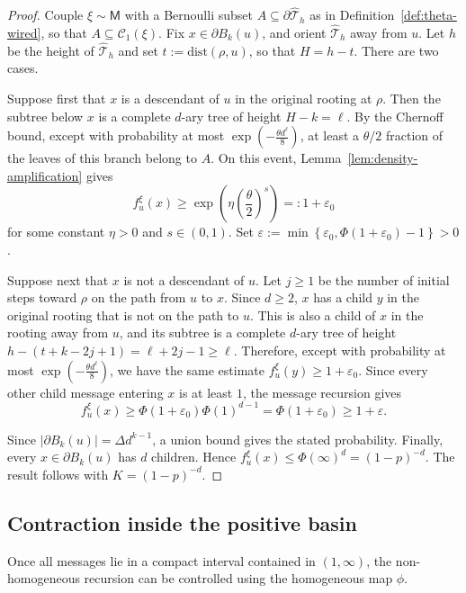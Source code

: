 \documentclass[11pt]{amsart}
\theoremstyle{plain}
\theoremstyle{definition}
\theoremstyle{remark}
\newcommand{\dreg}{\widehat {\mathcal T}_h}
\newcommand{\dist}{\mathrm{dist}}
\begin{document}
\begin{proof}
Couple $\xi\sim\mathsf M$ with a Bernoulli subset $A\subseteq\partial\dreg$ as in Definition~\ref{def:theta-wired}, so that $A\subseteq\mathcal C_1(\xi)$. Fix $x\in\partial B_k(u)$, and orient $\dreg$ away from $u$. Let $h$ be the height of $\dreg$ and set $t:=\dist(\rho,u)$, so that $H=h-t$. There are two cases.

Suppose first that $x$ is a descendant of $u$ in the original rooting at $\rho$. Then the subtree below $x$ is a complete $d$-ary tree of height $H-k=\ell$. By the Chernoff bound, except with probability at most $\exp\left(-\frac{\theta d^{\ell}}8\right)$, at least a $\theta/2$ fraction of the leaves of this branch belong to
$A$. On this event, Lemma~\ref{lem:density-amplification} gives
\[
    f_u^\xi(x)
    \ge
    \exp\left(
        \eta\left(\frac\theta2\right)^s
    \right)
    =:
    1+\varepsilon_0
\]
for some constant $\eta > 0$ and $s \in (0, 1)$. Set $\varepsilon:=\min\left\{\varepsilon_0,\Phi(1+\varepsilon_0)-1\right\}>0$.

Suppose next that $x$ is not a descendant of $u$. Let $j\ge1$ be the number of initial steps toward $\rho$ on the path from $u$ to $x$. Since $d\ge2$, $x$ has a child $y$ in the original rooting that is not on the path to $u$. This is also a child of $x$ in the rooting away from $u$, and its subtree is a complete $d$-ary tree of height $h-(t+k-2j+1)=\ell+2j-1\ge\ell$. Therefore, except with probability at most $\exp\left(-\frac{\theta d^\ell}{8}\right)$, we have the same estimate $f_u^\xi(y)\ge1+\varepsilon_0$. Since every other child message entering $x$ is at least $1$, the message recursion gives
\[
    f_u^\xi(x)
    \ge
    \Phi(1+\varepsilon_0)\Phi(1)^{d-1}
    =
    \Phi(1+\varepsilon_0)
    \ge
    1+\varepsilon.
\]

Since $|\partial B_k(u)|=\Delta d^{k-1}$, a union bound gives the stated probability. Finally, every $x\in\partial B_k(u)$ has $d$ children. Hence $f_u^\xi(x)\le\Phi(\infty)^d=(1-p)^{-d}$. The result follows with $K=(1-p)^{-d}$.
\end{proof}

\subsection{Contraction inside the positive basin}
\label{subsec:contraction}

Once all messages lie in a compact interval contained in $(1,\infty)$, the non-homogeneous recursion can be controlled using the homogeneous map $\phi$.
\end{document}
